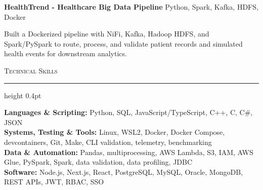 \documentclass[letterpaper,11pt]{article}
\newcommand{\resumesection}[1]{%
  \par\vspace{2pt}%
  {\large\scshape #1}\par\vspace{2pt}%
  \hrule height 0.4pt\vspace{2pt}%
}
\newcommand{\projectHeading}[2]{
  \textbf{#1} \hfill #2
}
\begin{document}
\projectHeading{HealthTrend - Healthcare Big Data Pipeline}{Python, Spark, Kafka, HDFS, Docker}
\begin{tightitemize}
  \item Built a Dockerized pipeline with NiFi, Kafka, Hadoop HDFS, and Spark/PySpark to route, process, and validate patient records and simulated health events for downstream analytics.
\end{tightitemize}

\resumesection{Technical Skills}
\textbf{Languages \& Scripting:} Python, SQL, JavaScript/TypeScript, C++, C, C\#, JSON\\
\textbf{Systems, Testing \& Tools:} Linux, WSL2, Docker, Docker Compose, devcontainers, Git, Make, CLI validation, telemetry, benchmarking\\
\textbf{Data \& Automation:} Pandas, multiprocessing, AWS Lambda, S3, IAM, AWS Glue, PySpark, Spark, data validation, data profiling, JDBC\\
\textbf{Software:} Node.js, Next.js, React, PostgreSQL, MySQL, Oracle, MongoDB, REST APIs, JWT, RBAC, SSO
\end{document}
